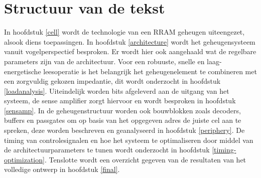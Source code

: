 \section{Structuur van de tekst}
In hoofdstuk \ref{cell} wordt de technologie van een RRAM geheugen uiteengezet, alsook diens toepassingen. In hoofdstuk \ref{architecture} wordt het geheugensysteem vanuit vogelperspectief besproken. Er wordt hier ook aangehaald wat de regelbare parameters zijn van de architectuur. Voor een robuuste, snelle en laag-energetische leesoperatie is het belangrijk het geheugenelement te combineren met een zorgvuldig gekozen impedantie, dit wordt onderzocht in hoofdstuk \ref{loadanalysis}. Uiteindelijk worden bits afgeleverd aan de uitgang van het systeem, de sense amplifier zorgt hiervoor en wordt besproken in hoofdstuk \ref{sensamp}.
In de geheugenstructuur worden ook bouwblokken zoals decoders, buffers en passgates om op basis van het opgegeven adres de juiste cel aan te spreken, deze worden beschreven en geanalyseerd in hoofdstuk \ref{periphery}.
De timing van controlesignalen en hoe het systeem te optimaliseren door middel van de architectuurparameters te tunen wordt onderzocht in hoofdstuk \ref{timing-optimization}. Tenslotte wordt een overzicht gegeven van de resultaten van het volledige ontwerp in hoofdstuk \ref{final}.
